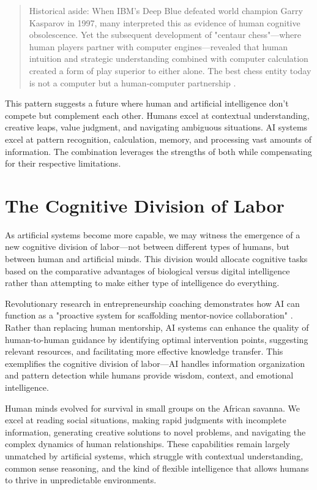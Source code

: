 \begin{quote}\small
Historical aside: When IBM's Deep Blue defeated world champion Garry Kasparov in 1997, many interpreted this as evidence of human cognitive obsolescence. Yet the subsequent development of "centaur chess"—where human players partner with computer engines—revealed that human intuition and strategic understanding combined with computer calculation created a form of play superior to either alone. The best chess entity today is not a computer but a human-computer partnership \parencite{kasparov2017deep}.
\end{quote}

This pattern suggests a future where human and artificial intelligence don't compete but complement each other. Humans excel at contextual understanding, creative leaps, value judgment, and navigating ambiguous situations. AI systems excel at pattern recognition, calculation, memory, and processing vast amounts of information. The combination leverages the strengths of both while compensating for their respective limitations.

\section{The Cognitive Division of Labor}

As artificial systems become more capable, we may witness the emergence of a new cognitive division of labor—not between different types of humans, but between human and artificial minds. This division would allocate cognitive tasks based on the comparative advantages of biological versus digital intelligence rather than attempting to make either type of intelligence do everything.

Revolutionary research in entrepreneurship coaching demonstrates how AI can function as a "proactive system for scaffolding mentor-novice collaboration" \parencite{huang2025scaffolding}. Rather than replacing human mentorship, AI systems can enhance the quality of human-to-human guidance by identifying optimal intervention points, suggesting relevant resources, and facilitating more effective knowledge transfer. This exemplifies the cognitive division of labor—AI handles information organization and pattern detection while humans provide wisdom, context, and emotional intelligence.

Human minds evolved for survival in small groups on the African savanna. We excel at reading social situations, making rapid judgments with incomplete information, generating creative solutions to novel problems, and navigating the complex dynamics of human relationships. These capabilities remain largely unmatched by artificial systems, which struggle with contextual understanding, common sense reasoning, and the kind of flexible intelligence that allows humans to thrive in unpredictable environments.

